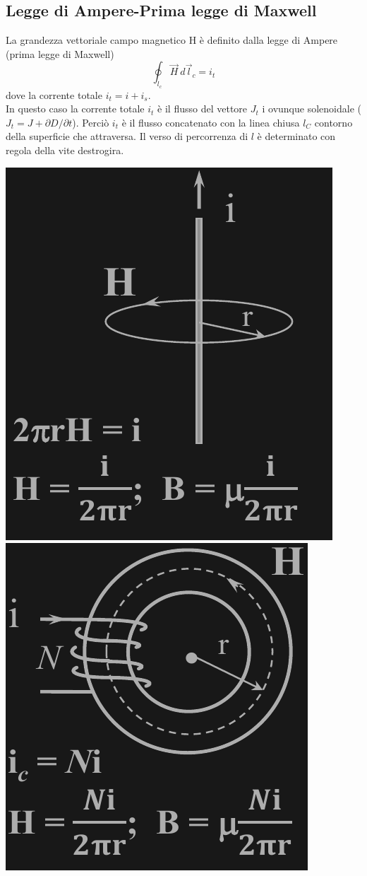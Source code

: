 \documentclass{article}
\begin{document}
\subsection{Legge di Ampere-Prima legge di Maxwell}
La grandezza vettoriale campo magnetico H è definito dalla legge di Ampere (prima legge di Maxwell)
\[
    \oint _{l_c} \vec H \ d \vec l_c = i_t
\]
dove la corrente totale $i_t = i + i_s$.\\
In questo caso la corrente totale $i_t$ è il flusso del vettore $J_t$ i ovunque solenoidale ($J_t = J + \partial D/ \partial t$). Perciò $i_t$ è il flusso concatenato con la linea chiusa $l_C$ contorno della superficie che attraversa. Il verso di percorrenza di $l$ è determinato con regola della vite destrogira.
\begin{center}
    \includegraphics[scale=0.3]{Image/Campo magnetico.png}
    \includegraphics[scale=0.3]{Image/Campo magnetico-2.png}
\end{center}
\end{document}
